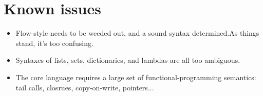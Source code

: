 \chapter{Known issues}

\begin{itemize}
\item Flow-style needs to be weeded out, and a sound syntax determined.As things stand, it's too confusing.
\item Syntaxes of lists, sets, dictionaries, and lambdas are all too ambiguous.
\end{itemize}

\begin{itemize}
\item The core language requires a large set of functional-programming semantics: tail calls, closrues, copy-on-write, pointers...
\end{itemize}
